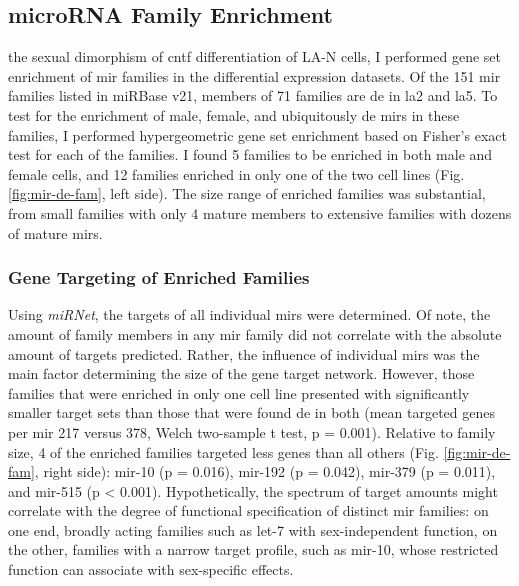 \subsection{microRNA Family Enrichment}
 the sexual dimorphism of \ac{cntf} differentiation of LA-N cells, I performed gene set enrichment of \ac{mir} families in the differential expression datasets. Of the 151 \ac{mir} families listed in miRBase v21, members of 71 families are \ac{de} in \ac{la2} and \ac{la5}. To test for the enrichment of male, female, and ubiquitously \ac{de} \acp{mir} in these families, I performed hypergeometric gene set enrichment based on Fisher's exact test for each of the families. I found 5 families to be enriched in both male and female cells, and 12 families enriched in only one of the two cell lines (Fig. \ref{fig:mir-de-fam}, left side). The size range of enriched families was substantial, from small families with only 4 mature members to extensive families with dozens of mature \acp{mir}. 

\subsubsection{Gene Targeting of Enriched Families}
Using \textit{miRNet}, the targets of all individual \acp{mir} were determined. Of note, the amount of family members in any \ac{mir} family did not correlate with the absolute amount of targets predicted. Rather, the influence of individual \acp{mir} was the main factor determining the size of the gene target network. However, those families that were enriched in only one cell line presented with significantly smaller target sets than those that were found \ac{de} in both (mean targeted genes per \ac{mir} 217 versus 378, Welch two-sample t test, p = 0.001). Relative to family size, 4 of the enriched families targeted less genes than all others (Fig. \ref{fig:mir-de-fam}, right side): mir-10 (p = 0.016), mir-192 (p = 0.042), mir-379 (p = 0.011), and mir-515 (p < 0.001). Hypothetically, the spectrum of target amounts might correlate with the degree of functional specification of distinct \ac{mir} families: on one end, broadly acting families such as let-7 with sex-independent function, on the other, families with a narrow target profile, such as mir-10, whose restricted function can associate with sex-specific effects.

